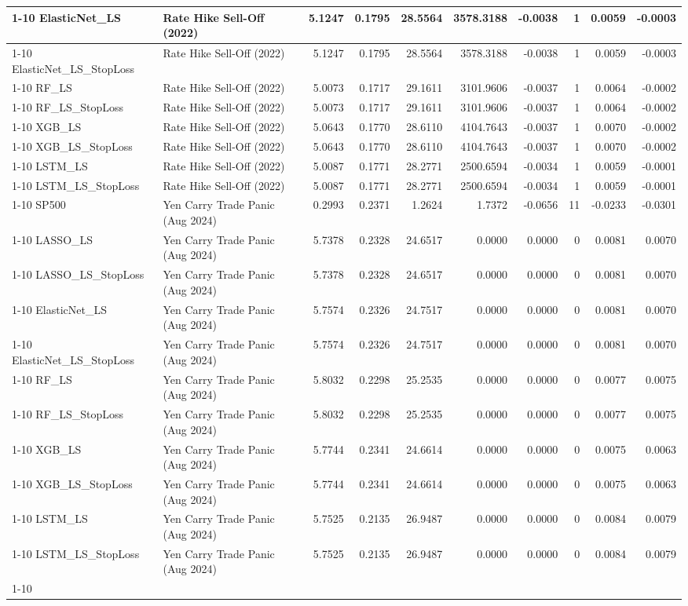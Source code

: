 \begin{tabular}{llrrrrrrrr}
\cline{1-10}
ElasticNet\_LS & Rate Hike Sell-Off (2022) & 5.1247 & 0.1795 & 28.5564 & 3578.3188 & -0.0038 & 1 & 0.0059 & -0.0003 \\
\cline{1-10}
ElasticNet\_LS\_StopLoss & Rate Hike Sell-Off (2022) & 5.1247 & 0.1795 & 28.5564 & 3578.3188 & -0.0038 & 1 & 0.0059 & -0.0003 \\
\cline{1-10}
RF\_LS & Rate Hike Sell-Off (2022) & 5.0073 & 0.1717 & 29.1611 & 3101.9606 & -0.0037 & 1 & 0.0064 & -0.0002 \\
\cline{1-10}
RF\_LS\_StopLoss & Rate Hike Sell-Off (2022) & 5.0073 & 0.1717 & 29.1611 & 3101.9606 & -0.0037 & 1 & 0.0064 & -0.0002 \\
\cline{1-10}
XGB\_LS & Rate Hike Sell-Off (2022) & 5.0643 & 0.1770 & 28.6110 & 4104.7643 & -0.0037 & 1 & 0.0070 & -0.0002 \\
\cline{1-10}
XGB\_LS\_StopLoss & Rate Hike Sell-Off (2022) & 5.0643 & 0.1770 & 28.6110 & 4104.7643 & -0.0037 & 1 & 0.0070 & -0.0002 \\
\cline{1-10}
LSTM\_LS & Rate Hike Sell-Off (2022) & 5.0087 & 0.1771 & 28.2771 & 2500.6594 & -0.0034 & 1 & 0.0059 & -0.0001 \\
\cline{1-10}
LSTM\_LS\_StopLoss & Rate Hike Sell-Off (2022) & 5.0087 & 0.1771 & 28.2771 & 2500.6594 & -0.0034 & 1 & 0.0059 & -0.0001 \\
\cline{1-10}
SP500 & Yen Carry Trade Panic (Aug 2024) & 0.2993 & 0.2371 & 1.2624 & 1.7372 & -0.0656 & 11 & -0.0233 & -0.0301 \\
\cline{1-10}
LASSO\_LS & Yen Carry Trade Panic (Aug 2024) & 5.7378 & 0.2328 & 24.6517 & 0.0000 & 0.0000 & 0 & 0.0081 & 0.0070 \\
\cline{1-10}
LASSO\_LS\_StopLoss & Yen Carry Trade Panic (Aug 2024) & 5.7378 & 0.2328 & 24.6517 & 0.0000 & 0.0000 & 0 & 0.0081 & 0.0070 \\
\cline{1-10}
ElasticNet\_LS & Yen Carry Trade Panic (Aug 2024) & 5.7574 & 0.2326 & 24.7517 & 0.0000 & 0.0000 & 0 & 0.0081 & 0.0070 \\
\cline{1-10}
ElasticNet\_LS\_StopLoss & Yen Carry Trade Panic (Aug 2024) & 5.7574 & 0.2326 & 24.7517 & 0.0000 & 0.0000 & 0 & 0.0081 & 0.0070 \\
\cline{1-10}
RF\_LS & Yen Carry Trade Panic (Aug 2024) & 5.8032 & 0.2298 & 25.2535 & 0.0000 & 0.0000 & 0 & 0.0077 & 0.0075 \\
\cline{1-10}
RF\_LS\_StopLoss & Yen Carry Trade Panic (Aug 2024) & 5.8032 & 0.2298 & 25.2535 & 0.0000 & 0.0000 & 0 & 0.0077 & 0.0075 \\
\cline{1-10}
XGB\_LS & Yen Carry Trade Panic (Aug 2024) & 5.7744 & 0.2341 & 24.6614 & 0.0000 & 0.0000 & 0 & 0.0075 & 0.0063 \\
\cline{1-10}
XGB\_LS\_StopLoss & Yen Carry Trade Panic (Aug 2024) & 5.7744 & 0.2341 & 24.6614 & 0.0000 & 0.0000 & 0 & 0.0075 & 0.0063 \\
\cline{1-10}
LSTM\_LS & Yen Carry Trade Panic (Aug 2024) & 5.7525 & 0.2135 & 26.9487 & 0.0000 & 0.0000 & 0 & 0.0084 & 0.0079 \\
\cline{1-10}
LSTM\_LS\_StopLoss & Yen Carry Trade Panic (Aug 2024) & 5.7525 & 0.2135 & 26.9487 & 0.0000 & 0.0000 & 0 & 0.0084 & 0.0079 \\
\cline{1-10}
\bottomrule
\end{tabular}
